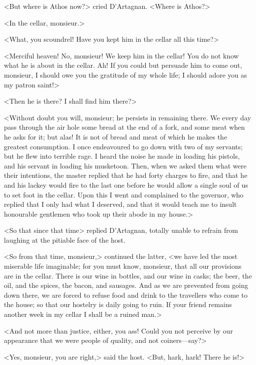 <But where is Athos now?> cried D'Artagnan. <Where is Athos?> 

<In the cellar, monsieur.> 

<What, you scoundrel! Have you kept him in the cellar all this time?> 

<Merciful heaven! No, monsieur! We keep him in the cellar! You do not know what he is about in the cellar. Ah! If you could but persuade him to come out, monsieur, I should owe you the gratitude of my whole life; I should adore you as my patron saint!> 

<Then he is there? I shall find him there?> 

<Without doubt you will, monsieur; he persists in remaining there. We every day pass through the air hole some bread at the end of a fork, and some meat when he asks for it; but alas! It is not of bread and meat of which he makes the greatest consumption. I once endeavoured to go down with two of my servants; but he flew into terrible rage. I heard the noise he made in loading his pistols, and his servant in loading his musketoon. Then, when we asked them what were their intentions, the master replied that he had forty charges to fire, and that he and his lackey would fire to the last one before he would allow a single soul of us to set foot in the cellar. Upon this I went and complained to the governor, who replied that I only had what I deserved, and that it would teach me to insult honourable gentlemen who took up their abode in my house.> 

<So that since that time\longdash> replied D'Artagnan, totally unable to refrain from laughing at the pitiable face of the host. 

<So from that time, monsieur,> continued the latter, <we have led the most miserable life imaginable; for you must know, monsieur, that all our provisions are in the cellar. There is our wine in bottles, and our wine in casks; the beer, the oil, and the spices, the bacon, and sausages. And as we are prevented from going down there, we are forced to refuse food and drink to the travellers who come to the house; so that our hostelry is daily going to ruin. If your friend remains another week in my cellar I shall be a ruined man.> 

<And not more than justice, either, you ass! Could you not perceive by our appearance that we were people of quality, and not coiners—say?> 

<Yes, monsieur, you are right,> said the host. <But, hark, hark! There he is!> 


